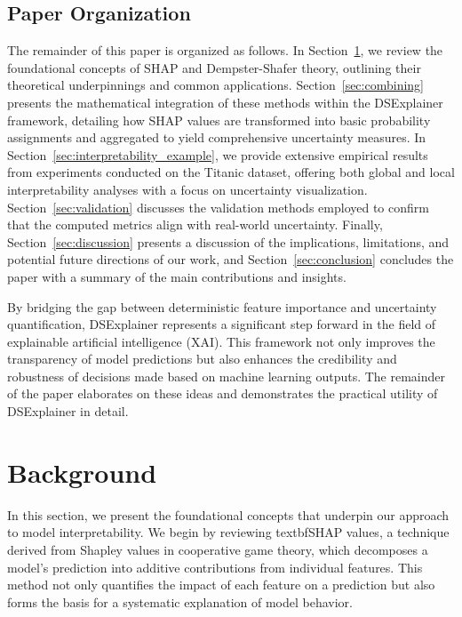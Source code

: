 \documentclass[acmlarge]{acmart}
\begin{document}
\subsection{Paper Organization}
The remainder of this paper is organized as follows. In Section~\ref{sec:background}, we review the foundational concepts of SHAP and Dempster-Shafer theory, outlining their theoretical underpinnings and common applications. Section~\ref{sec:combining} presents the mathematical integration of these methods within the DSExplainer framework, detailing how SHAP values are transformed into basic probability assignments and aggregated to yield comprehensive uncertainty measures. In Section~\ref{sec:interpretability_example}, we provide extensive empirical results from experiments conducted on the Titanic dataset, offering both global and local interpretability analyses with a focus on uncertainty visualization. Section~\ref{sec:validation} discusses the validation methods employed to confirm that the computed metrics align with real-world uncertainty. Finally, Section~\ref{sec:discussion} presents a discussion of the implications, limitations, and potential future directions of our work, and Section~\ref{sec:conclusion} concludes the paper with a summary of the main contributions and insights.

By bridging the gap between deterministic feature importance and uncertainty quantification, DSExplainer represents a significant step forward in the field of explainable artificial intelligence (XAI). This framework not only improves the transparency of model predictions but also enhances the credibility and robustness of decisions made based on machine learning outputs. The remainder of the paper elaborates on these ideas and demonstrates the practical utility of DSExplainer in detail.


\section{Background}
\label{sec:background}

In this section, we present the foundational concepts that underpin our approach to model interpretability. We begin by reviewing textbf{SHAP values}, a technique derived from Shapley values in cooperative game theory, which decomposes a model’s prediction into additive contributions from individual features. This method not only quantifies the impact of each feature on a prediction but also forms the basis for a systematic explanation of model behavior.
\end{document}
